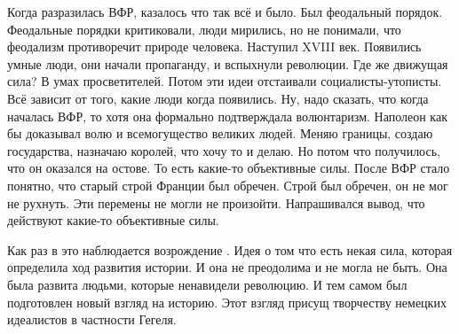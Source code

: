 Когда разразилась ВФР, казалось что так всё и было. Был феодальный порядок. Феодальные порядки критиковали, люди мирились, но не понимали, что феодализм противоречит природе человека. Наступил XVIII век. Появились умные люди, они начали пропаганду, и вспыхнули революции. Где же движущая сила? В умах просветителей. Потом эти идеи отстаивали социалисты-утописты. Всё зависит от того, какие люди когда появились. Ну, надо сказать, что когда началась ВФР, то хотя она формально подтверждала волюнтаризм. Наполеон как бы доказывал волю и всемогущество великих людей. Меняю границы, создаю государства, назначаю королей, что хочу то и делаю. Но потом что получилось, что он оказался на остове. То есть какие-то объективные силы. После ВФР стало понятно, что старый строй Франции был обречен. Строй был обречен, он не мог не рухнуть. Эти перемены не могли не произойти. Напрашивался вывод, что действуют какие-то объективные силы.

Как раз в это наблюдается возрождение . Идея о том что есть некая сила, которая определила ход развития истории. И она не преодолима и не могла не быть. Она была развита людьми, которые ненавидели революцию. И тем самом был подготовлен новый взгляд на историю. Этот взгляд присущ творчеству немецких идеалистов в частности Гегеля.
